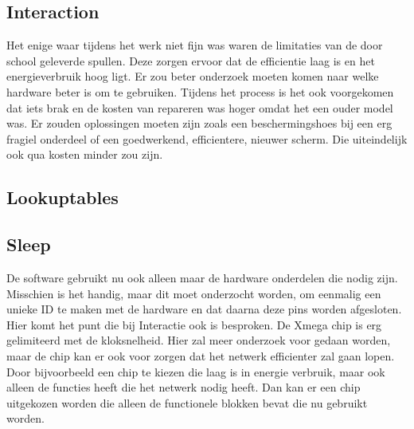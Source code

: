 \subsection{Interaction}
Het enige waar tijdens het werk niet fijn was waren de limitaties van de door school geleverde spullen. Deze zorgen ervoor dat de 
efficientie laag is en het energieverbruik hoog ligt. Er zou beter onderzoek moeten komen naar welke hardware beter is om te gebruiken.
Tijdens het process is het ook voorgekomen dat iets brak en de kosten van repareren was hoger omdat het een ouder model was. Er zouden oplossingen
moeten zijn zoals een beschermingshoes bij een erg fragiel onderdeel of een goedwerkend, efficientere, nieuwer scherm. Die uiteindelijk ook 
qua kosten minder zou zijn.

\subsection{Lookuptables}


\subsection{Sleep}
De software gebruikt nu ook alleen maar de hardware onderdelen die nodig zijn. Misschien is het handig, maar dit moet onderzocht worden, 
om eenmalig een unieke ID te maken met de hardware en dat daarna deze pins worden afgesloten. Hier komt het punt die bij Interactie ook is 
besproken. De Xmega chip is erg gelimiteerd met de kloksnelheid. Hier zal meer onderzoek voor gedaan worden, maar de chip kan er ook voor zorgen 
dat het netwerk efficienter zal gaan lopen. Door bijvoorbeeld een chip te kiezen die laag is in energie verbruik, maar ook alleen de functies heeft die 
het netwerk nodig heeft. Dan kan er een chip uitgekozen worden die alleen de functionele blokken bevat die nu gebruikt worden.
